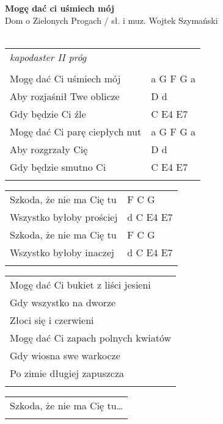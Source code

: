 \documentclass[a5paper]{article}
\begin{document}


\noindent
\fontsize{12pt}{15pt}\selectfont
\textbf{Mogę dać ci uśmiech mój} \\
\fontsize{8pt}{10pt}\selectfont
Dom o Zielonych Progach / sł. i muz. Wojtek Szymański \\ \\
\fontsize{10pt}{12pt}\selectfont
{}
\begin{tabular}{@{}p{7.50cm}p{3cm}@{}}
\noindent
\emph{kapodaster II próg} & \\ \\
Mogę dać Ci uśmiech mój	& a G F G a \\
Aby rozjaśnił Twe oblicze & D d \\
Gdy będzie Ci źle & C E4 E7 \\
Mogę dać Ci parę ciepłych nut & a G F G a \\
Aby rozgrzały Cię & D d \\
Gdy będzie smutno Ci & C E4 E7 \\ \\
\end{tabular}

\noindent
\begin{tabular}{@{}p{6.50cm}p{3cm}@{}}
Szkoda, że nie ma Cię tu & F C G \\
Wszystko byłoby prościej & d C E4 E7 \\
Szkoda, że nie ma Cię tu & F C G \\
Wszystko byłoby inaczej & d C E4 E7 \\ \\
\end{tabular}

\noindent
\begin{tabular}{@{}p{7.50cm}@{}}
Mogę dać Ci bukiet z liści jesieni \\
Gdy wszystko na dworze \\
Złoci się i czerwieni \\
Mogę dać Ci zapach polnych kwiatów \\
Gdy wiosna swe warkocze \\
Po zimie długiej zapuszcza \\ \\
\end{tabular}

\noindent
\begin{tabular}{@{}p{6.50cm}@{}}
Szkoda, że nie ma Cię tu… \\ \\
\end{tabular}
\end{document}

